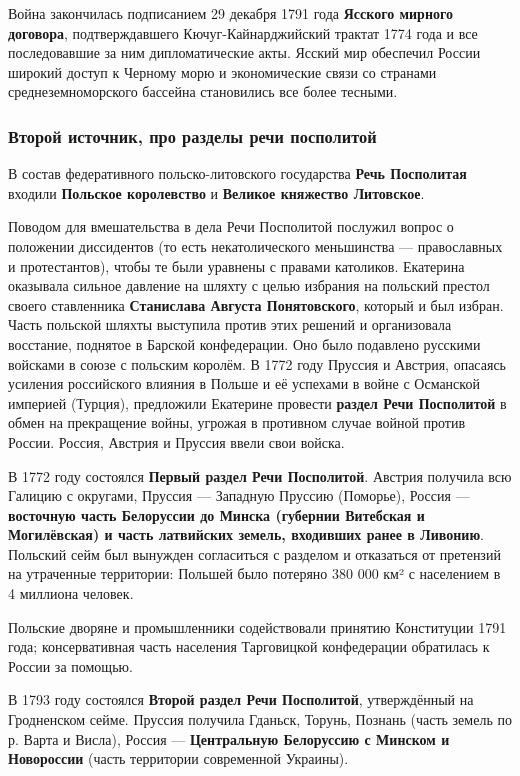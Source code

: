 \documentclass{article}
\begin{document}
Война закончилась подписанием 29 декабря 1791 года \textbf{Ясского мирного договора}, подтверждавшего Кючуг-Кайнарджийский трактат 1774 года и все последовавшие за ним дипломатические акты. Ясский мир обеспечил России широкий доступ к Черному морю и экономические связи со странами среднеземноморского бассейна становились все более тесными.

\subsubsection{Второй источник, про разделы речи посполитой}

В состав федеративного польско-литовского государства \textbf{Речь Посполитая} входили \textbf{Польское королевство} и \textbf{Великое княжество Литовское}.

\hfill

Поводом для вмешательства в дела Речи Посполитой послужил вопрос о положении диссидентов (то есть некатолического меньшинства — православных и протестантов), чтобы те были уравнены с правами католиков. Екатерина оказывала сильное давление на шляхту с целью избрания на польский престол своего ставленника \textbf{Станислава Августа Понятовского}, который и был избран. Часть польской шляхты выступила против этих решений и организовала восстание, поднятое в Барской конфедерации. Оно было подавлено русскими войсками в союзе с польским королём. В 1772 году Пруссия и Австрия, опасаясь усиления российского влияния в Польше и её успехами в войне с Османской империей (Турция), предложили Екатерине провести \textbf{раздел Речи Посполитой} в обмен на прекращение войны, угрожая в противном случае войной против России. Россия, Австрия и Пруссия ввели свои войска.

\hfill

В 1772 году состоялся \textbf{Первый раздел Речи Посполитой}. Австрия получила всю Галицию с округами, Пруссия — Западную Пруссию (Поморье), Россия — \textbf{восточную часть Белоруссии до Минска (губернии Витебская и Могилёвская) и часть латвийских земель, входивших ранее в Ливонию}. Польский сейм был вынужден согласиться с разделом и отказаться от претензий на утраченные территории: Польшей было потеряно 380 000 км² с населением в 4 миллиона человек.

Польские дворяне и промышленники содействовали принятию Конституции 1791 года; консервативная часть населения Тарговицкой конфедерации обратилась к России за помощью.

\hfill

В 1793 году состоялся \textbf{Второй раздел Речи Посполитой}, утверждённый на Гродненском сейме. Пруссия получила Гданьск, Торунь, Познань (часть земель по р. Варта и Висла), Россия — \textbf{Центральную Белоруссию с Минском и Новороссии} (часть территории современной Украины).
\end{document}
